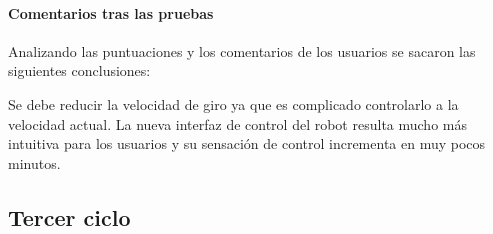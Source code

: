 \documentclass[twoside, 11pt]{epstfg}
\begin{document}
\paragraph{Comentarios tras las pruebas}

Analizando las puntuaciones y los comentarios de los usuarios se sacaron las siguientes conclusiones:

Se debe reducir la velocidad de giro ya que es complicado controlarlo a la velocidad actual.
La nueva interfaz de control del robot resulta mucho más intuitiva para los usuarios y su sensación de control incrementa en muy pocos minutos.

\subsection{Tercer ciclo}
\end{document}
